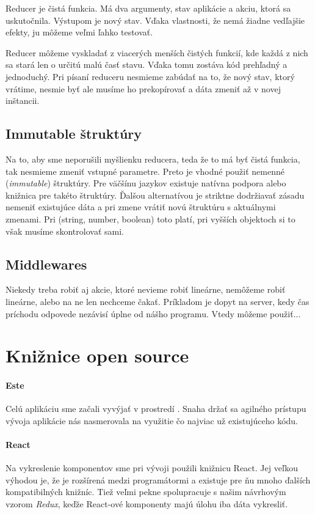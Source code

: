 Reducer je čistá funkcia. Má dva argumenty, stav aplikácie a akciu, ktorá sa uskutočnila. Výstupom je nový stav. Vďaka vlastnosti, že nemá žiadne vedľajšie efekty, ju môžeme veľmi ľahko testovať.

Reducer môžeme vyskladať z viacerých menších čistých funkcií, kde každá z nich sa stará len o určitú malú časť stavu. Vďaka tomu zostáva kód prehľadný a jednoduchý. %
Pri písaní reduceru nesmieme zabúdať na to, že nový stav, ktorý vrátime, nesmie byť  ale musíme ho prekopírovať a dáta zmeniť až v novej inštancii.

\subsection{Immutable štruktúry}
Na to, aby sme neporušili myšlienku reducera, teda že to má byť čistá funkcia, tak nesmieme zmeniť vstupné parametre. Preto je vhodné použiť nemenné (\emph{immutable}) štruktúry. Pre väčšínu jazykov existuje natívna podpora alebo knižnica pre takéto štruktúry. Ďalšou alternatívou je striktne dodržiavať zásadu nemeniť existujúce dáta a pri zmene vrátiť novú štruktúru s aktuálnymi zmenami. Pri (string, number, boolean) %
toto platí, pri vyšších objektoch si to však musíme skontrolovať sami.

\subsection{Middlewares}
Niekedy treba robiť aj akcie, ktoré nevieme robiť lineárne, nemôžeme robiť lineárne, alebo na ne len nechceme čakať. Príkladom je dopyt na server, kedy čas príchodu odpovede nezávisí úplne od nášho programu. Vtedy môžeme použiť...%
\TODO



\section{Knižnice open source}%

\paragraph{Este}
Celú aplikáciu sme začali vyvýjať v prostredí \cite[este]{Este}. Snaha držať sa agilného prístupu vývoja aplikácie nás nasmerovala na využitie čo najviac už existujúceho kódu. %

\paragraph{React}
Na vykreslenie komponentov sme pri vývoji použili knižnicu React. Jej veľkou výhodou je, že je rozšírená medzi programátormi a existuje pre ňu mnoho ďalších kompatibilných knižníc. Tiež veľmi pekne spolupracuje s našim návrhovým vzorom \emph{Redux}, keďže React-ové komponenty majú úlohu iba dáta vykresliť.

